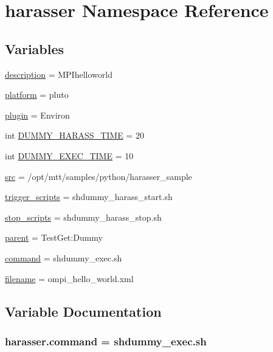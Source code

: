 \hypertarget{namespaceharasser}{\section{harasser Namespace Reference}
\label{namespaceharasser}
}
\subsection*{Variables}
\begin{DoxyCompactItemize}
\item 
\hyperlink{namespaceharasser_ae9df0d8dd5280b3f68c1594d929d77e9}{description} = M\-P\-Ihelloworld
\item 
\hyperlink{namespaceharasser_aa827937946f071c462edd50adeffbf99}{platform} = pluto
\item 
\hyperlink{namespaceharasser_af41bea3324a7007e30dccbc1526e63b2}{plugin} = Environ
\item 
int \hyperlink{namespaceharasser_a5335f316caefd7dcb9a59e1541f56a10}{D\-U\-M\-M\-Y\-\_\-\-H\-A\-R\-A\-S\-S\-\_\-\-T\-I\-M\-E} = 20
\item 
int \hyperlink{namespaceharasser_a3663429ea3884044eef5813de2c88893}{D\-U\-M\-M\-Y\-\_\-\-E\-X\-E\-C\-\_\-\-T\-I\-M\-E} = 10
\item 
\hyperlink{namespaceharasser_a5cb1fdd5bdc77091984dbf7901fd7e00}{src} = /opt/mtt/samples/python/harasser\-\_\-sample
\item 
\hyperlink{namespaceharasser_aaf0bf1c41f9f803a38db036d20b51461}{trigger\-\_\-scripts} = shdummy\-\_\-harass\-\_\-start.\-sh
\item 
\hyperlink{namespaceharasser_acf2bbc7d9fff08e2232c16a79b0e72f4}{stop\-\_\-scripts} = shdummy\-\_\-harass\-\_\-stop.\-sh
\item 
\hyperlink{namespaceharasser_af9d9d7cb6a6d68880aeec6ccfa16ca23}{parent} = Test\-Get\-:\-Dummy
\item 
\hyperlink{namespaceharasser_a688e3d531b66f0b8013fd72625d9a0b5}{command} = shdummy\-\_\-exec.\-sh
\item 
\hyperlink{namespaceharasser_a8ee1446e84f466e788ff1e2b61666751}{filename} = ompi\-\_\-hello\-\_\-world.\-xml
\end{DoxyCompactItemize}


\subsection{Variable Documentation}
\hypertarget{namespaceharasser_a688e3d531b66f0b8013fd72625d9a0b5}{
\subsubsection[{command}]{\setlength{\rightskip}{0pt plus 5cm}harasser.\-command = shdummy\-\_\-exec.\-sh}}\label{namespaceharasser_a688e3d531b66f0b8013fd72625d9a0b5}



